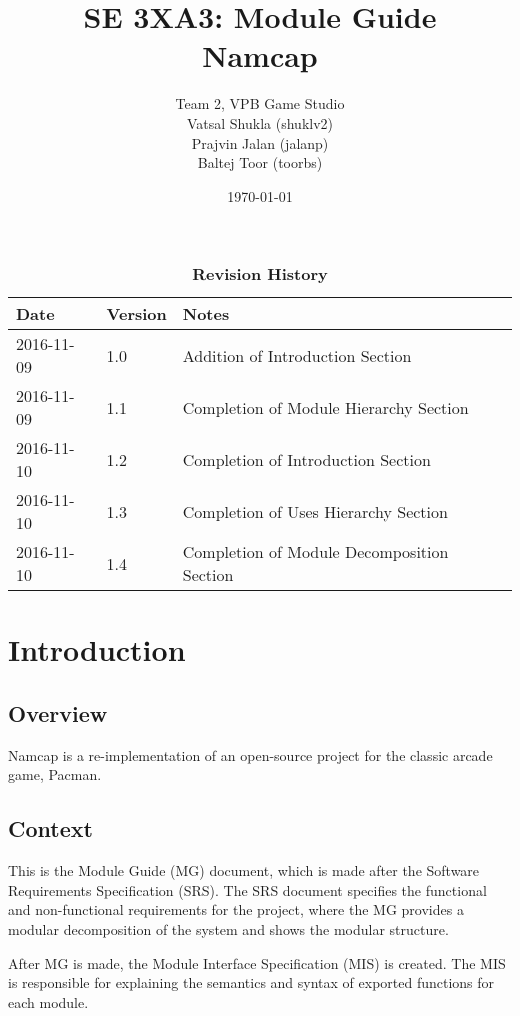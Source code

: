 \documentclass[12pt, titlepage]{article}
\title{SE 3XA3: Module Guide\\Namcap}
\author{Team 2, VPB Game Studio
		\\ Vatsal Shukla (shuklv2)
		\\ Prajvin Jalan (jalanp)
		\\ Baltej Toor (toorbs)
}
\date{\today}
\begin{document}
\maketitle

\tableofcontents
\listoftables
\listoffigures

\begin{table}[h]
\caption{\bf Revision History}
\begin{tabularx}{\textwidth}{p{3cm}p{2cm}X}
\toprule {\bf Date} & {\bf Version} & {\bf Notes}\\
\midrule
2016-11-09 & 1.0 & Addition of Introduction Section\\
2016-11-09 & 1.1 & Completion of Module Hierarchy Section\\
2016-11-10 & 1.2 & Completion of Introduction Section\\
2016-11-10 & 1.3 & Completion of Uses Hierarchy Section\\
2016-11-10 & 1.4 & Completion of Module Decomposition Section\\
\bottomrule
\end{tabularx}
\end{table}

\newpage


\section{Introduction}

\subsection{Overview}
Namcap is a re-implementation of an open-source project for the classic arcade game, Pacman.

\subsection{Context}
This is the Module Guide (MG) document, which is made after the Software Requirements Specification (SRS). The SRS document specifies the functional and non-functional requirements for the project, where the MG provides a modular decomposition of the system and shows the modular structure.

  After MG is made, the Module Interface Specification (MIS) is created. The MIS is responsible for explaining the semantics and syntax of exported functions for each module.
\end{document}

